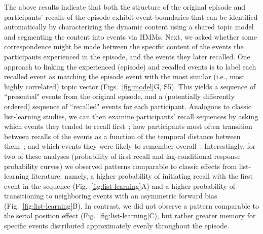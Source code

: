 \documentclass{article}
\newcommand{\matchmats}{S5}
\begin{document}
The above results indicate that both the structure of the original episode and participants' recalls of the episode exhibit event boundaries that can be identified automatically by characterizing the dynamic content using a shared topic model and segmenting the content into events via HMMs.  Next, we asked whether some correspondence might be made between the specific content of the events the participants experienced in the episode, and the events they later recalled.  One approach to linking the experienced (episode) and recalled events is to label each recalled event as matching the episode event with the most similar (i.e., most highly correlated) topic vector (Figs.~\ref{fig:model}G, \matchmats).  This yields a sequence of ``presented" events from the original episode, and a (potentially differently ordered) sequence of ``recalled" events for each participant.  Analogous to classic list-learning studies, we can then examine participants' recall sequences by asking which events they tended to recall first~\citep[probability of first recall; Fig.~\ref{fig:list-learning}A;][]{AtkiShif68, PostPhil65, WelcBurn24}; how participants most often transition between recalls of the events as a function of the temporal distance between them~\citep[lag-conditional response probability; Fig.~\ref{fig:list-learning}B;][]{Kaha96}; and which events they were likely to remember overall~\citep[serial position recall analyses; Fig.~\ref{fig:list-learning}C;][]{Murd62a}. Interestingly, for two of these analyses (probability of first recall and lag-conditional response probability curves) we observed patterns comparable to classic effects from list-learning literature: namely, a higher probability of initiating recall with the first event in the sequence (Fig.~\ref{fig:list-learning}A) and a higher probability of transitioning to neighboring events with an asymmetric forward bias (Fig.~\ref{fig:list-learning}B). In contrast, we did not observe a pattern comparable to the serial position effect (Fig.~\ref{fig:list-learning}C), but rather greater memory for specific events distributed approximately evenly throughout the episode.
\end{document}
